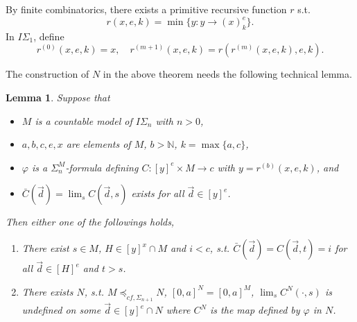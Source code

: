 \documentclass[twoside,a4paper]{amsart}
\newtheorem{lemma}[theorem]{Lemma}
\theoremstyle{definition}
\theoremstyle{theorem}
\numberwithin{equation}{section}
\newcommand{\<}{\langle}
\renewcommand{\>}{\rangle}
\begin{document}
By finite combinatorics, there exists a primitive recursive function $r$ s.t.
\[
  r(x,e,k) = \min\{y: y \to (x)^e_k\}.
\]
In $I\Sigma_1$, define
\[
  r^{(0)}(x,e,k) = x,\quad
  r^{(m+1)}(x,e,k) = r(r^{(m)}(x,e,k),e,k).
\]

The construction of $N$ in the above theorem needs the following technical lemma.

\begin{lemma}\label{lem:FRT-WPHP}
Suppose that 
\begin{itemize}
 \item[(a)] $M$ is a countable model of $I\Sigma_n$ with $n > 0$,
 \item[(b)] $a,b,c,e,x$ are elements of $M$, $b > \mathbb{N}$, $k = \max\{a,c\}$,
 \item[(c)] $\varphi$ is a $\Sigma_n^M$-formula defining $C: [y]^e \times M \to c$ 
 with $y = r^{(b)}(x,e,k)$, and
 \item[(d)] $\bar{C}(\vec{d}) = \lim_s C(\vec{d},s)$ exists for all $\vec{d} \in [y]^e$.
\end{itemize}
Then either one of the followings holds,
\begin{enumerate}
 \item[(1)] There exist $s \in M$, $H \in [y]^x \cap M$ and $i < c$, s.t.
 $\bar{C}(\vec{d}) = C(\vec{d},t) = i$ for all $\vec{d} \in [H]^e$ and $t > s$.
 \item[(2)] There exists $N$, s.t. $M \preceq_{cf,\Sigma_{n+1}} N$, 
 $[0,a]^N = [0,a]^M$, $\lim_s C^N(\cdot,s)$ is undefined on some $\vec{d} \in [y]^e \cap N$ where $C^N$ is the map defined by $\varphi$ in $N$.
\end{enumerate}
\end{lemma}
\end{document}
